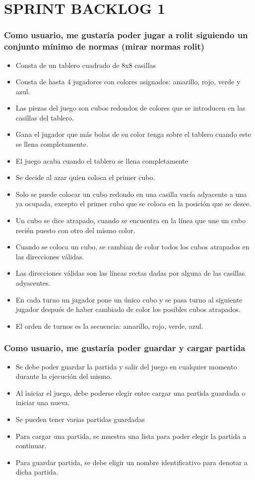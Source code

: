 \documentclass{article}
\begin{document}
\section*{SPRINT BACKLOG 1}
\subsubsection*{Como usuario, me gustaría poder jugar a rolit siguiendo un conjunto mínimo de normas (mirar normas rolit)}
\begin{itemize}
\item Consta de un tablero cuadrado de 8x8 casillas
\item Consta de hasta 4 jugadores con colores asignados: amarillo, rojo, verde y azul.
\item Las piezas del juego son cubos redondos de colores que se introducen en las casillas del tablero.
\item Gana el jugador que más bolas de su color tenga sobre el tablero cuando este se llena completamente.
\item El juego acaba cuando el tablero se llena completamente
\item Se decide al azar quien coloca el primer cubo.
\item Solo se puede colocar un cubo redondo en una casilla vacía adyacente a una ya ocupada, excepto el primer cubo que se coloca en la posición que se desee.
\item Un cubo se dice atrapado, cuando se encuentra en la línea que une un cubo recién puesto con otro del mismo color.
\item Cuando se coloca un cubo, se cambian de color todos los cubos atrapados en las direcciones válidas.
\item Las direcciones válidas son las líneas rectas dadas por alguna de las casillas adyacentes.
\item En cada turno un jugador pone un único cubo y se pasa turno al siguiente jugador después de haber cambiado de color los posibles cubos atrapados.
\item El orden de turnos es la secuencia: amarillo, rojo, verde, azul.
\end{itemize}

\subsubsection*{Como usuario, me gustaría poder guardar y cargar partida}
\begin{itemize}
\item Se debe poder guardar la partida y salir del juego en cualquier momento durante la ejecución del mismo.
\item Al iniciar el juego, debe poderse elegir entre cargar una partida guardada o iniciar una nueva.
\item Se pueden tener varias partidas guardadas
\item Para cargar una partida, se muestra una lista para poder elegir la partida a continuar.
\item Para guardar partida, se debe eligir un nombre identificativo para denotar a dicha partida.
\end{itemize}
\end{document}
